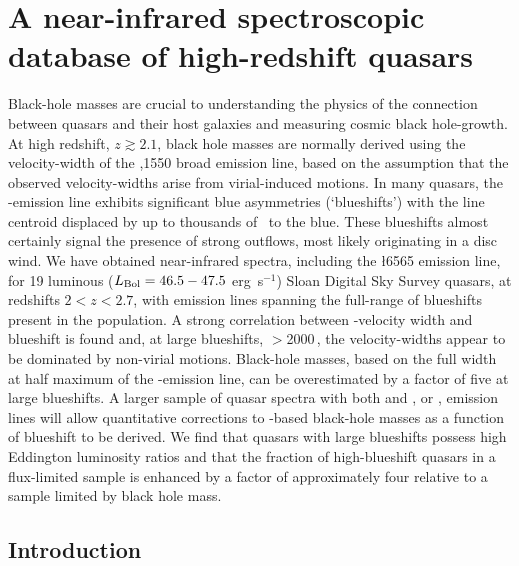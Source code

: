 \chapter{A near-infrared spectroscopic database of high-redshift quasars}\label{ch:chapter02}

Black-hole masses are crucial to understanding the physics of the connection between quasars and their host galaxies and measuring cosmic black hole-growth. 
At high redshift, $z \gtrsim 2.1$, black hole masses are normally derived using the velocity-width of the ,1550 broad emission line, based on the assumption that the observed velocity-widths arise from virial-induced motions.  
In many quasars, the -emission line exhibits significant blue asymmetries (`blueshifts') with the line centroid displaced by up to thousands of \kms\, to the blue. 
These blueshifts almost certainly signal the presence of strong outflows, most likely originating in a disc wind.
We have obtained near-infrared spectra, including the \ha\l6565 emission line, for 19 luminous ($L_{\rm Bol} = 46.5-47.5$ erg~s$^{-1}$) Sloan Digital Sky Survey quasars, at redshifts $2 < z < 2.7$, with  emission lines spanning the full-range of blueshifts present in the population.  
A strong correlation between -velocity width and blueshift is found and, at large blueshifts, $>$2000\,\kms, the velocity-widths appear to be dominated by non-virial motions. 
Black-hole masses, based on the full width at half maximum of the -emission line, can be overestimated by a factor of five at large blueshifts. 
A larger sample of quasar spectra with both  and \hbns, or \hans, emission lines will allow quantitative corrections to -based black-hole masses as a function of blueshift to be derived. 
We find that quasars with large  blueshifts possess high Eddington luminosity ratios and that the fraction of high-blueshift quasars in a flux-limited sample is enhanced by a factor of approximately four relative to a sample limited by black hole mass.    

\section{Introduction}
\label{ch:2-sec:intro}

